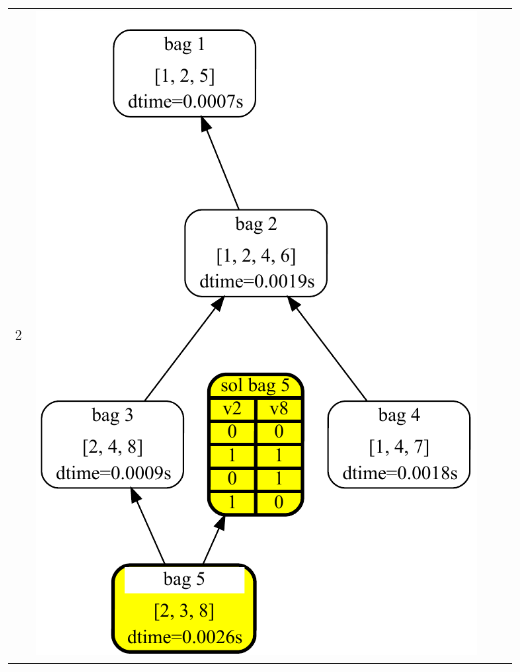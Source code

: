 \documentclass[a4paper, 12pt, bibliography=totoc]{scrartcl}
\begin{document}
\begin{table}\sffamily
\begin{tabular}{l*3{c}}
	\toprule
	2 & \includegraphics[height=0.46\textheight]{images/DA4SAT/results/TDStep2.pdf} &

\end{tabular}
\end{table}
\end{document}
